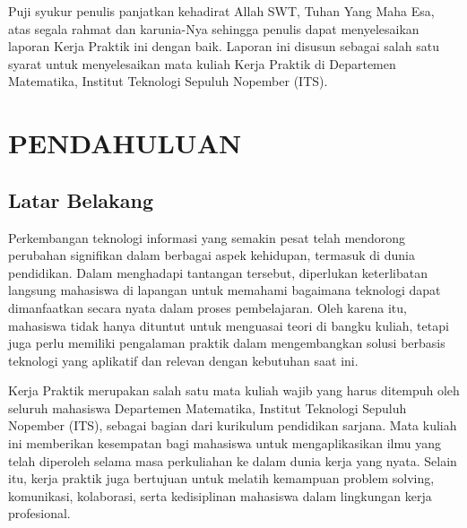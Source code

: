 \documentclass{file/KP-ITS}
\theoremstyle{definition}
\theoremstyle{definition}
\theoremstyle{plain}
\begin{document}

\BagianAwal
\Cover
\LembarJudul
\TitlePage
\LembarPengesahanDepartemen
\LembarPengesahanInstansi
\LembarOrisinalitas

\restoregeometry
\KataPengantar
Puji syukur penulis panjatkan kehadirat Allah SWT, Tuhan Yang Maha Esa, atas segala rahmat dan karunia-Nya sehingga penulis dapat menyelesaikan laporan Kerja Praktik ini dengan baik. Laporan ini disusun sebagai salah satu syarat untuk menyelesaikan mata kuliah Kerja Praktik di Departemen Matematika, Institut Teknologi Sepuluh Nopember (ITS).


\DaftarIsi

\DaftarGambar

\DaftarTabel





\BagianInti

\chapter{PENDAHULUAN}
\section{Latar Belakang}
Perkembangan teknologi informasi yang semakin pesat telah mendorong perubahan signifikan dalam berbagai aspek kehidupan, termasuk di dunia pendidikan. Dalam menghadapi tantangan tersebut, diperlukan keterlibatan langsung mahasiswa di lapangan untuk memahami bagaimana teknologi dapat dimanfaatkan secara nyata dalam proses pembelajaran. Oleh karena itu, mahasiswa tidak hanya dituntut untuk menguasai teori di bangku kuliah, tetapi juga perlu memiliki pengalaman praktik dalam mengembangkan solusi berbasis teknologi yang aplikatif dan relevan dengan kebutuhan saat ini.

Kerja Praktik merupakan salah satu mata kuliah wajib yang harus ditempuh oleh seluruh mahasiswa Departemen Matematika, Institut Teknologi Sepuluh Nopember (ITS), sebagai bagian dari kurikulum pendidikan sarjana. Mata kuliah ini memberikan kesempatan bagi mahasiswa untuk mengaplikasikan ilmu yang telah diperoleh selama masa perkuliahan ke dalam dunia kerja yang nyata. Selain itu, kerja praktik juga bertujuan untuk melatih kemampuan problem solving, komunikasi, kolaborasi, serta kedisiplinan mahasiswa dalam lingkungan kerja profesional.
\end{document}
